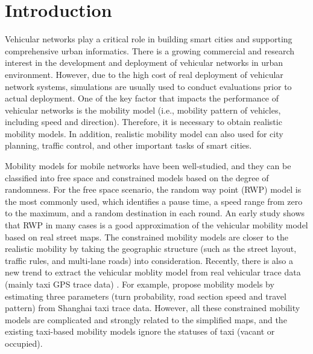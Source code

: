 \section{Introduction}
\label{section_introduction}

Vehicular networks play a critical role in building smart cities and supporting comprehensive urban informatics. There is a growing commercial and research interest in the development and deployment of vehicular networks in urban environment. However, due to the high cost of real deployment of vehicular network systems, simulations are usually used to conduct evaluations prior to actual deployment. One of the key factor that impacts the performance of vehicular networks is the mobility model (i.e., mobility pattern of vehicles, including speed and direction). Therefore, it is necessary to obtain realistic mobility models. In addition, realistic mobility model can also used for city planning, traffic control, and other important tasks of smart cities.

Mobility models for mobile networks \cite{LuChen-104,AhmedKarmakar-106} have been well-studied, and they can be classified into free space and constrained models based on the degree of randomness.
For the free space scenario, the random way point (RWP) model \cite{broch1998performance} is the most commonly used, which identifies a pause time, a speed range from zero to the maximum, and a random destination in each round. An early study \cite{SahaJohnson-91} shows that RWP in many cases is a good approximation of the vehicular mobility model based on real street maps. The constrained mobility models \cite{SahaJohnson-91,MartinezCano-87,ChoffnesBustamante-93}  are closer to the realistic mobility by taking the geographic structure (such as the street layout, traffic rules, and multi-lane roads) into consideration. Recently, there is also a new trend to extract the vehicular moblity model from real vehicular trace data (mainly taxi GPS trace data) \cite{KimKotz-99,HuangZhu-88}. For example, \cite{HuangZhu-88} propose mobility models by estimating three parameters (turn probability, road section speed and travel pattern) from Shanghai taxi trace data. However, all these constrained mobility models are complicated and strongly related to the simplified maps, and the existing taxi-based mobility models ignore the statuses of taxi (vacant or occupied).

